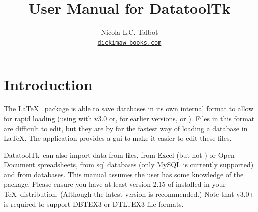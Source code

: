 
\usepackage{fontspec}
\setmainfont{Linux Libertine O}
\usepackage{verbatim}
\usepackage
 [
    novref,
 ]{texjavahelp}

\hypersetup{colorlinks,linkcolor=blue}

\graphicspath{{images/}}


\newcommand{\actionoptval}[2]{\actionopt{#1}\dequals #2}
\newcommand{\actionoptvalm}[2]{\actionopt{#1}\dequals \marg{#2}}

\newcommand{\appname}{DatatoolTk}


\title{User Manual for \appname}
\author{Nicola L.C. Talbot\\\href{https://www.dickimaw-books.com/}{\nolinkurl{dickimaw-books.com}}}


\GlsXtrLoadResources[src={datatooltk,\langbibsrcs},
 \TeXJavaHelpSymbolResourceOptions
]

\GlsXtrLoadResources[src={datatooltk,\langbibsrcs},
 \TeXJavaHelpGlsResourceOptions
]


\maketitle
\frontmatter
\tableofcontents
\listoffigures

\mainmatter
\chapter{Introduction}
\label{sec:introduction}

The \LaTeX\  package is able to save databases in its
own internal format to allow for rapid loading (using
 with
 v3.0 or, for earlier versions,
 or
).  Files in this
 format are difficult to edit, but they are by far the
fastest way of loading a  \gls{database} in \LaTeX.
The  application provides a \gls{gui} to make it
easier to edit these files. 

\appname\ can also import data from  files, from Excel
 (but not ) or Open Document 
spreadsheets, from \gls{sql} databases (only MySQL is currently
supported) and from  databases.  This manual assumes
the user has some knowledge of the  package. Please
ensure you have at least version 2.15 of  installed in
your \TeX\ distribution.  (Although the latest version is
recommended.) Note that  v3.0+ is required to support 
\gls{DBTEX3} or \gls{DTLTEX3} file formats.

